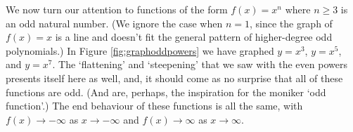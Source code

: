 


\smallskip

We now turn our attention to functions of the form $f(x) = x^{n}$ where $n \geq 3$ is an odd natural number. (We ignore the case when $n=1$, since the graph of $f(x)=x$ is a line and doesn't fit the general pattern of higher-degree odd polynomials.) In Figure \ref{fig:graphoddpowers} we have graphed $y=x^3$, $y=x^5$, and $y=x^7$.    The `flattening' and `steepening' that we saw with the even powers presents itself here as well, and, it should come as no surprise that all of these functions are odd. (And are, perhaps, the inspiration for the moniker `odd function'.)  The end behaviour of these functions is all the same, with $f(x) \rightarrow -\infty$ as $x \rightarrow -\infty$ and $f(x) \rightarrow \infty$ as $x \rightarrow \infty$.



